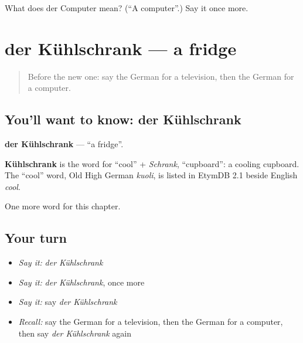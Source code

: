 \begin{tcolorbox}[breakable,colback=teal!4,colframe=teal!35!black,title={Before you move on}]
What does der Computer mean? (\textquotedblleft{}A computer\textquotedblright{}.) Say it once more.
\end{tcolorbox}
\section[der Kühlschrank]{der Kühlschrank — a fridge}

\label{lesson:GE-C112-kuehlschrank}



\begin{quote}
Before the new one: say the German for a television, then the German for a computer.
\end{quote}

\subsection*{You'll want to know: der Kühlschrank}
\textbf{der Kühlschrank} — \textquotedblleft{}a fridge\textquotedblright{}.

\begin{cousinweb}
\textbf{Kühlschrank} is the word for \textquotedblleft{}cool\textquotedblright{} + \emph{Schrank}, \textquotedblleft{}cupboard\textquotedblright{}: a cooling cupboard. The \textquotedblleft{}cool\textquotedblright{} word, Old High German \emph{kuoli}, is listed in EtymDB 2.1 beside English \emph{cool}.
\end{cousinweb}

\begin{grammarlens}[title={What you've built}]
One more word for this chapter.
\end{grammarlens}

\subsection*{Your turn}
\begin{itemize}
\raggedright
  \item \emph{Say it:} \emph{der Kühlschrank}
  \item \emph{Say it:} \emph{der Kühlschrank}, once more
  \item \emph{Say it:} say \emph{der Kühlschrank}
  \item \emph{Recall:} say the German for a television, then the German for a computer, then say \emph{der Kühlschrank} again
\end{itemize}

